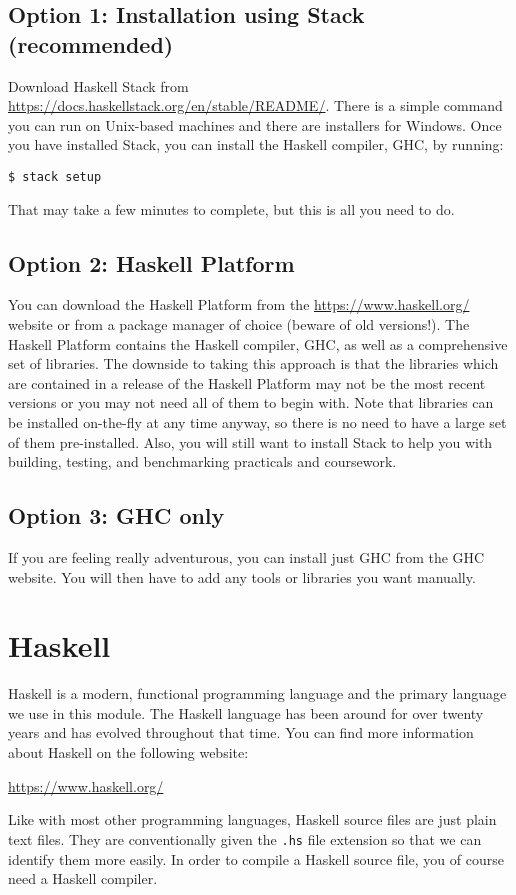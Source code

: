 \subsection{Option 1: Installation using Stack (recommended)}

Download Haskell Stack from \url{https://docs.haskellstack.org/en/stable/README/}. There is a simple command you can run on Unix-based machines and there are installers for Windows. Once you have installed Stack, you can install the Haskell compiler, GHC, by running:
\begin{verbatim}
$ stack setup
\end{verbatim}
That may take a few minutes to complete, but this is all you need to do.

\subsection{Option 2: Haskell Platform}

You can download the Haskell Platform from the \url{https://www.haskell.org/} website or from a package manager of choice (beware of old versions!). The Haskell Platform contains the Haskell compiler, GHC, as well as a comprehensive set of libraries. The downside to taking this approach is that the libraries which are contained in a release of the Haskell Platform may not be the most recent versions or you may not need all of them to begin with. Note that libraries can be installed on-the-fly at any time anyway, so there is no need to have a large set of them pre-installed. Also, you will still want to install Stack to help you with building, testing, and benchmarking practicals and coursework.

\subsection{Option 3: GHC only}

If you are feeling really adventurous, you can install just GHC from the GHC website. You will then have to add any tools or libraries you want manually.

\section{Haskell}

Haskell is a modern, functional programming language and the primary language we use in this module. The Haskell language has been around for over twenty years and has evolved throughout that time. You can find more information about Haskell on the following website:
\begin{center}
	\url{https://www.haskell.org/}
\end{center}
Like with most other programming languages, Haskell source files are just plain text files. They are conventionally given the \texttt{\small .hs} file extension so that we can identify them more easily. In order to compile a Haskell source file, you of course need a Haskell compiler.

